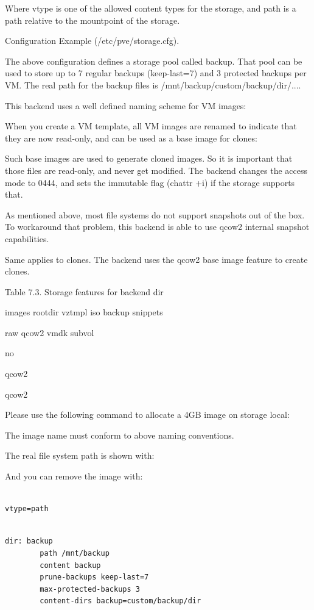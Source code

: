 Where vtype is one of the allowed content types for the storage, and path is a path relative to the mountpoint of the storage.

Configuration Example (/etc/pve/storage.cfg).

The above configuration defines a storage pool called backup. That pool can be used to store up to 7 regular backups (keep-last=7) and 3 protected backups per VM. The real path for the backup files is /mnt/backup/custom/backup/dir/....

This backend uses a well defined naming scheme for VM images:

When you create a VM template, all VM images are renamed to indicate that they are now read-only, and can be used as a base image for clones:

Such base images are used to generate cloned images. So it is important that those files are read-only, and never get modified. The backend changes the access mode to 0444, and sets the immutable flag (chattr +i) if the storage supports that.

As mentioned above, most file systems do not support snapshots out of the box. To workaround that problem, this backend is able to use qcow2 internal snapshot capabilities.

Same applies to clones. The backend uses the qcow2 base image feature to create clones.

Table 7.3. Storage features for backend dir

images rootdir vztmpl iso backup snippets

raw qcow2 vmdk subvol

no

qcow2

qcow2

Please use the following command to allocate a 4GB image on storage local:

The image name must conform to above naming conventions.

The real file system path is shown with:

And you can remove the image with:

\begin{lstlisting}

vtype=path

\end{lstlisting}

\begin{lstlisting}

dir: backup
        path /mnt/backup
        content backup
        prune-backups keep-last=7
        max-protected-backups 3
        content-dirs backup=custom/backup/dir

\end{lstlisting}

